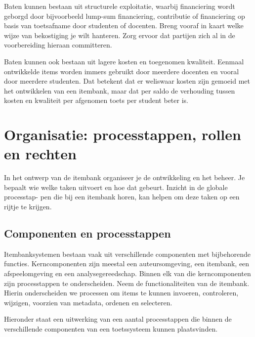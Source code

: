 \documentclass[
]{book}
\begin{document}
Baten kunnen bestaan uit structurele exploitatie, waarbij financiering wordt geborgd door bijvoorbeeld lump-sum financiering, contributie of financiering op basis van toetsafname door studenten of docenten. Breng vooraf in kaart welke wijze van bekostiging je wilt hanteren. Zorg ervoor dat partijen zich al in de voorbereiding hieraan committeren.

Baten kunnen ook bestaan uit lagere kosten en toegenomen kwaliteit. Eenmaal ontwikkelde items worden immers gebruikt door meerdere docenten en vooral door meerdere studenten. Dat betekent dat er weliswaar kosten zijn gemoeid met het ontwikkelen van een itembank, maar dat per saldo de verhouding tussen kosten en kwaliteit per afgenomen toets per student beter is.

\hypertarget{organisatie-processtappen-rollen-en-rechten}{%
\section{Organisatie: processtappen, rollen en rechten}\label{organisatie-processtappen-rollen-en-rechten}}

In het ontwerp van de itembank organiseer je de ontwikkeling en het beheer. Je bepaalt wie welke taken uitvoert en hoe dat gebeurt. Inzicht in de globale processtap- pen die bij een itembank horen, kan helpen om deze taken op een rijtje te krijgen.

\hypertarget{componenten-en-processtappen}{%
\subsection{Componenten en processtappen}\label{componenten-en-processtappen}}

Itembanksystemen bestaan vaak uit verschillende componenten met bijbehorende functies. Kerncomponenten zijn meestal een auteursomgeving, een itembank, een afspeelomgeving en een analysegereedschap. Binnen elk van die kerncomponenten zijn processtappen te onderscheiden. Neem de functionaliteiten van de itembank. Hierin onderscheiden we processen om items te kunnen invoeren, controleren, wijzigen, voorzien van metadata, ordenen en selecteren.

Hieronder staat een uitwerking van een aantal processtappen die binnen de verschillende componenten van een toetssysteem kunnen plaatsvinden.
\end{document}
